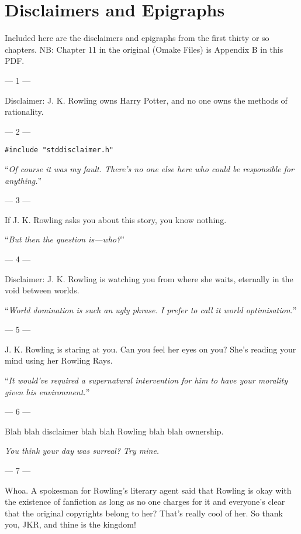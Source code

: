 \chapter{Disclaimers and Epigraphs}

Included here are the disclaimers and epigraphs from the first thirty or so
chapters. NB: Chapter 11 in the original (Omake Files) is Appendix B in this PDF.

\sbreak
\setlength{\parindent}{0pt}
\setlength{\parskip}{1em}

\filbreak
--- 1 ---

Disclaimer: J. K. Rowling owns Harry Potter, and no one owns the methods of rationality.


\filbreak
--- 2 ---

\texttt{\#include "stddisclaimer.h"}

``\emph{Of course it was my fault. There's no one else here who could be
responsible for anything.}''

\filbreak
--- 3 ---

If J. K. Rowling asks you about this story, you know nothing.

``\emph{But then the question is---who?}''

\filbreak
--- 4 ---

Disclaimer: J. K.
Rowling is watching you from where she waits, eternally in the void between
worlds.

``\emph{World domination is such an ugly phrase. I prefer to call it world
optimisation.}''

\filbreak
--- 5 ---

J. K. Rowling is
staring at you. Can you feel her eyes on you? She's reading your mind using her
Rowling Rays.

``\emph{It would've required a \emph{supernatural intervention} for him to have
\emph{your} morality given \emph{his} environment.}''

\filbreak
--- 6 ---

Blah blah
disclaimer blah blah Rowling blah blah ownership.

\emph{You think your day was surreal? Try mine.}

\filbreak
--- 7 ---

Whoa. A spokesman
for Rowling's literary agent said that Rowling is okay with the existence of
fanfiction as long as no one charges for it and everyone's clear that the
original copyrights belong to her? That's really cool of her. So thank you,
JKR, and thine is the kingdom!

